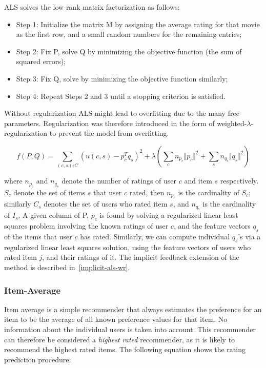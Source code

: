 ALS solves the low-rank matrix factorization as follows:

\begin{itemize}
\item Step 1: Initialize the matrix M by assigning the average rating for that movie as the first row, and a small random numbers for the remaining entries;
\item Step 2: Fix P, solve Q by minimizing the objective function (the sum of squared errors);
\item Step 3: Fix Q, solve by minimizing the objective function similarly;
\item Step 4: Repeat Steps 2 and 3 until a stopping criterion is satisfied.
\end{itemize}

Without regularization ALS might lead to overfitting due to the many free parameters. Regularization was
therefore introduced in the form of weighted-$\lambda$-regularization to prevent the model from overfitting.

\begin{equation}
f(P, Q) = \sum_{(c,s)\epsilon C} (u(c,s) - p^{T}_{c}q_{s})^{2} + \lambda (\sum_{c} n_{p_{c}} \Vert p_{c} \Vert ^{2} + \sum_{s} n_{q_{s}} \Vert q_{s} \Vert ^{2})
\label{WeightedLamba}
\end{equation}

where $n_{p_{c}}$ and $n_{q_{s}}$ denote the number of ratings of user $c$ and item $s$ respectively. $S_{c}$ denote
the set of items $s$ that user $c$ rated, then $n_{p_{c}}$ is the cardinality of $S_{c}$; similarly $C_{s}$ denotes
the set of users who rated item $s$, and $n_{q_{s}}$ is the cardinality of $I_{s}$. A given column of P, $p_{c}$ is
found by solving a regularized linear least squares problem involving the known ratings of user $c$, and the
feature vectors $q_{s}$ of the items that user $c$ has rated. Similarly, we can compute individual $q_{s}$'s via
a regularized linear least squares solution, using the feature vectors of users who rated item $j$, and their ratings of it.
The implicit feedback extension of the method is described in~\ref{implicit-als-wr}.

\subsubsection{Item-Average}

Item average is a simple recommender that always estimates the preference for an item to be the average of
all known preference values for that item. No information about the individual users is taken into account.
This recommender can therefore be considered a \emph{highest rated} recommender, as it is likely to recommend
the highest rated items. The following equation shows the rating prediction procedure:

